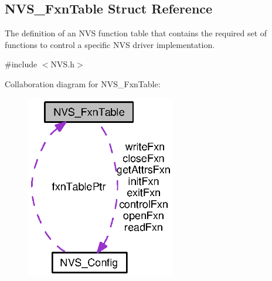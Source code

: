 \subsection{N\+V\+S\+\_\+\+Fxn\+Table Struct Reference}
\label{struct_n_v_s___fxn_table}


The definition of an N\+V\+S function table that contains the required set of functions to control a specific N\+V\+S driver implementation.  




{\ttfamily \#include $<$N\+V\+S.\+h$>$}



Collaboration diagram for N\+V\+S\+\_\+\+Fxn\+Table\+:
\nopagebreak
\begin{figure}[H]
\begin{center}
\leavevmode
\includegraphics[width=185pt]{struct_n_v_s___fxn_table__coll__graph}
\end{center}
\end{figure}
